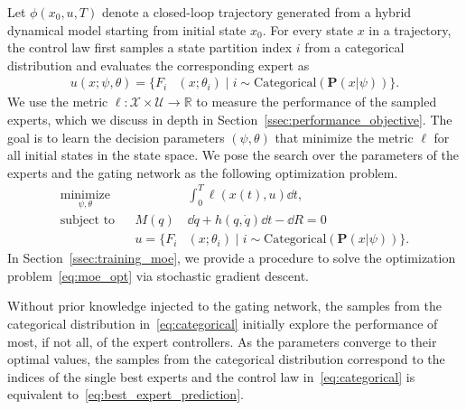 %
Let $\phi(x_0, u, T)$ denote a closed-loop trajectory generated from a hybrid
dynamical model starting from initial state $x_0$.
%
For every state $x$ in a trajectory, the control law first samples a state
partition index $i$ from a categorical distribution and evaluates the
corresponding expert as
\begin{align}
    u(x; \psi, \theta) = \{F_i&(x; \theta_i) \; | \; i  \sim \text{Categorical} (\mathbf{P}(x| \psi)) \}.
    \label{eq:categorical}
\end{align} 
%
We use the metric $\ell : \mathcal{X} \times \mathcal{U} \rightarrow
\mathbb{R}$ to measure the performance of the sampled experts, which we discuss
in depth in Section~\ref{ssec:performance_objective}.
%
%
The goal is to learn the decision parameters $(\psi, \theta)$ that minimize the
metric $\ell$ for all initial states in the state space.
%
We pose the search over the parameters of the experts and the gating network as the following optimization problem.
\begin{equation}
    \begin{aligned}
        \underset{\psi, \theta}{\textrm{minimize}} 
        & & &\int_0^T \ell (x(t),u) \dd t , \\%
        \textrm{subject to}
        & & M(q) &\dd \dot{q} + h(q, \dot{q})\dd t - \dd R  = 0\\%
        & & u = \{F_i&(x; \theta_i) \; | \; i  \sim \text{Categorical} (\mathbf{P}(x| \psi)) \}.
    \end{aligned}
    \label{eq:moe_opt}
\end{equation}
%
In Section~\ref{ssec:training_moe}, we provide a procedure to solve the
optimization problem~\eqref{eq:moe_opt} via stochastic gradient descent. 
\begin{rem}
    Without prior knowledge injected to the gating network, the samples from the
    categorical distribution in~\eqref{eq:categorical} initially explore the
    performance of most, if not all, of the expert controllers.
    As the parameters converge to their optimal values, the samples from the
    categorical distribution correspond to the indices of the single best
    experts and the control law in~\eqref{eq:categorical} is equivalent
    to~\eqref{eq:best_expert_prediction}.
\end{rem}

